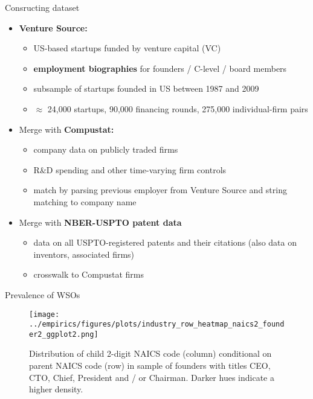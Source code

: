 \documentclass[english,usenames,dvipsnames]{beamer}
\begin{document}
\begin{frame}{Consructing dataset}
	\begin{itemize}
		\item \alert{\textbf{Venture Source:}} 
		\begin{itemize}
			\item US-based startups funded by venture capital (VC)
			\item \alert{\textbf{employment biographies}} for founders / C-level / board members
			\item subsample of startups founded in US between 1987 and 2009
			\item $\approx$ 24,000 startups, 90,000 financing rounds, 275,000 individual-firm pairs
		\end{itemize}
		\medskip
		\item Merge with \alert{\textbf{Compustat:}}
		\begin{itemize}
			\item company data on publicly traded firms 
			\item R\&D spending and other time-varying firm controls
			\item match by parsing previous employer from Venture Source and string matching to company name
		\end{itemize}
		\medskip
		\item Merge with \alert{\textbf{NBER-USPTO patent data}}
		\begin{itemize}
			\item data on all USPTO-registered patents and their citations (also data on inventors, associated firms)
			\item crosswalk to Compustat firms
		\end{itemize}
	\end{itemize}
\end{frame}

\begin{frame}{Prevalence of WSOs}
	\begin{figure}[]
		\centering
		\texttt{[image: ../empirics/figures/plots/industry\_row\_heatmap\_naics2\_founder2\_ggplot2.png]}
		\caption{\footnotesize Distribution of child 2-digit NAICS code (column) conditional on parent NAICS code (row) in sample of founders with titles CEO, CTO, Chief, President and / or Chairman. Darker hues indicate a higher density.}
		\label{figure:industry_row_heatmap_naics2_founder2}
	\end{figure}
\end{frame}
\end{document}
